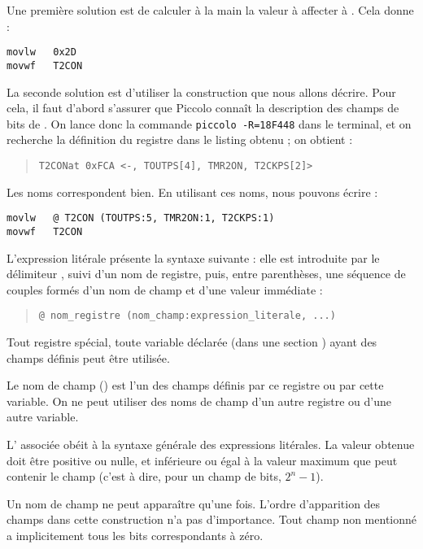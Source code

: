 Une première solution est de calculer à la main la valeur à affecter à . Cela donne :
\begin{lstlisting}[language=piccolo]
movlw   0x2D
movwf   T2CON
\end{lstlisting}

La seconde solution est d'utiliser la construction que nous allons décrire. Pour cela, il faut d'abord s’assurer que Piccolo connaît la description des champs de bits de . On lance donc la commande \texttt{piccolo -R=18F448} dans le terminal, et on recherche la définition du registre  dans le listing obtenu ; on obtient :
\begin{quote}
\texttt{\textquotesingle T2CON\textquotesingle at 0xFCA <-, TOUTPS[4], TMR2ON, T2CKPS[2]>}
\end{quote}

Les noms correspondent bien. En utilisant ces noms, nous pouvons écrire :
\begin{lstlisting}[language=piccolo]
movlw   @ T2CON (TOUTPS:5, TMR2ON:1, T2CKPS:1)
movwf   T2CON
\end{lstlisting}

L'expression litérale présente la syntaxe suivante : elle est introduite par le délimiteur , suivi d’un nom de registre, puis, entre parenthèses, une séquence de couples formés d’un nom de champ et d’une valeur immédiate :
\begin{quote}
\texttt{@ nom\_registre (nom\_champ:expression\_literale, ...)}
\end{quote}

Tout registre spécial, toute variable déclarée (dans une section ) ayant des champs définis peut être utilisée.

Le nom de champ () est l’un des champs définis par ce registre ou par cette variable. On ne peut utiliser des noms de champ d’un autre registre ou d’une autre variable.

L’ associée obéit à la syntaxe générale des expressions litérales. La valeur obtenue doit être positive ou nulle, et inférieure ou égal à la valeur maximum que peut contenir le champ (c’est à dire, pour un champ de  bits, $2^n-1$).

Un nom de champ ne peut apparaître qu’une fois. L’ordre d’apparition des champs dans cette construction n’a pas d’importance. Tout champ non mentionné a implicitement tous les bits correspondants à zéro.


